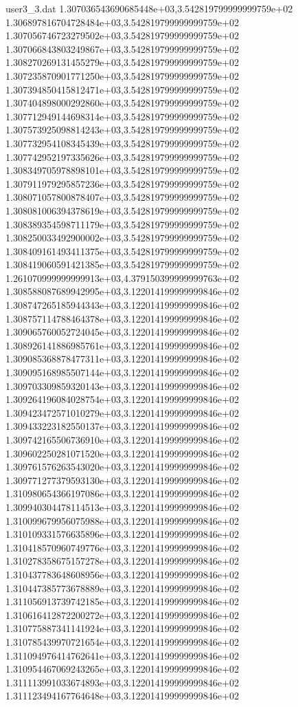 \begin{filecontents}{user3_3.dat}
1.307036543690685448e+03,3.542819799999999759e+02
1.306897816704728484e+03,3.542819799999999759e+02
1.307056746723279502e+03,3.542819799999999759e+02
1.307066843803249867e+03,3.542819799999999759e+02
1.308270269131455279e+03,3.542819799999999759e+02
1.307235870901771250e+03,3.542819799999999759e+02
1.307394850415812471e+03,3.542819799999999759e+02
1.307404898000292860e+03,3.542819799999999759e+02
1.307712949144698314e+03,3.542819799999999759e+02
1.307573925098814243e+03,3.542819799999999759e+02
1.307732954108345439e+03,3.542819799999999759e+02
1.307742952197335626e+03,3.542819799999999759e+02
1.308349705978898101e+03,3.542819799999999759e+02
1.307911979295857236e+03,3.542819799999999759e+02
1.308071057800878407e+03,3.542819799999999759e+02
1.308081006394378619e+03,3.542819799999999759e+02
1.308389354598711179e+03,3.542819799999999759e+02
1.308250033492900002e+03,3.542819799999999759e+02
1.308409161493411375e+03,3.542819799999999759e+02
1.308419060591421385e+03,3.542819799999999759e+02
1.261070999999999913e+03,4.379150399999999763e+02
1.308588087689942995e+03,3.122014199999999846e+02
1.308747265185944343e+03,3.122014199999999846e+02
1.308757114788464378e+03,3.122014199999999846e+02
1.309065760052724045e+03,3.122014199999999846e+02
1.308926141886985761e+03,3.122014199999999846e+02
1.309085368878477311e+03,3.122014199999999846e+02
1.309095168985507144e+03,3.122014199999999846e+02
1.309703309859320143e+03,3.122014199999999846e+02
1.309264196084028754e+03,3.122014199999999846e+02
1.309423472571010279e+03,3.122014199999999846e+02
1.309433223182550137e+03,3.122014199999999846e+02
1.309742165506736910e+03,3.122014199999999846e+02
1.309602250281071520e+03,3.122014199999999846e+02
1.309761576263543020e+03,3.122014199999999846e+02
1.309771277379593130e+03,3.122014199999999846e+02
1.310980654366197086e+03,3.122014199999999846e+02
1.309940304478114513e+03,3.122014199999999846e+02
1.310099679956075988e+03,3.122014199999999846e+02
1.310109331576635896e+03,3.122014199999999846e+02
1.310418570960749776e+03,3.122014199999999846e+02
1.310278358675157278e+03,3.122014199999999846e+02
1.310437783648608956e+03,3.122014199999999846e+02
1.310447385773678889e+03,3.122014199999999846e+02
1.311056913739742185e+03,3.122014199999999846e+02
1.310616412872200272e+03,3.122014199999999846e+02
1.310775887341141924e+03,3.122014199999999846e+02
1.310785439970721654e+03,3.122014199999999846e+02
1.311094976414762641e+03,3.122014199999999846e+02
1.310954467069243265e+03,3.122014199999999846e+02
1.311113991033674893e+03,3.122014199999999846e+02
1.311123494167764648e+03,3.122014199999999846e+02

\end{filecontents}
